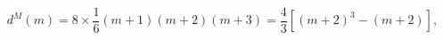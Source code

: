 \begin{equation}
d^M(m)=8\times\frac{1}{6}(m+1)(m+2)(m+3)=\frac{4}{3}\left[(m+2)^3-(m+2)\right],
\label{degferm}
\end{equation}

